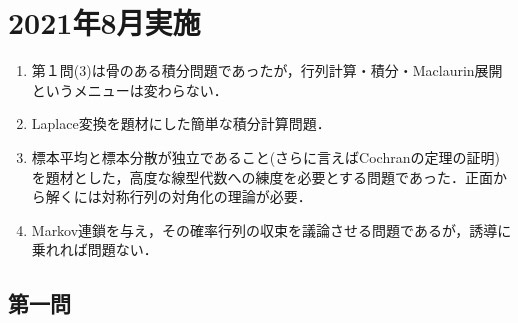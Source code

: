 \documentclass[uplatex,dvipdfmx]{jsarticle}
\begin{document}
\section{2021年8月実施}

\begin{tcolorbox}[colframe=ForestGreen, colback=ForestGreen!10!white,breakable,colbacktitle=ForestGreen!40!white,coltitle=black,fonttitle=\bfseries\sffamily,
title=]
    \begin{enumerate}[{第}1{問}]
        \item 第１問(3)は骨のある積分問題であったが，行列計算・積分・Maclaurin展開というメニューは変わらない．
        \item Laplace変換を題材にした簡単な積分計算問題．
        \item 標本平均と標本分散が独立であること(さらに言えばCochranの定理の証明)を題材とした，高度な線型代数への練度を必要とする問題であった．正面から解くには対称行列の対角化の理論が必要．
        \item Markov連鎖を与え，その確率行列の収束を議論させる問題であるが，誘導に乗れれば問題ない．
    \end{enumerate}
\end{tcolorbox}

\subsection{第一問}
\end{document}

